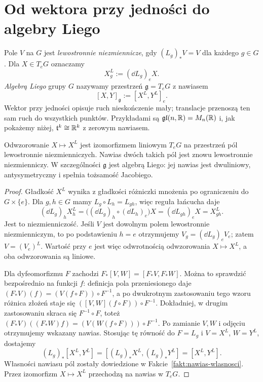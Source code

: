 \section{Od wektora przy jedności do algebry Liego}
\label{sec:algebra-liego}

\begin{definicja}
\label{def:algebra-liego}
Pole $V$ na $G$ jest \emph{lewostronnie niezmiennicze}, gdy
$(L_g)_*V=V$ dla każdego $g\in G$. Dla $X\in T_eG$ oznaczamy
\[
 X^L_g:=(\dd L_g)_eX.
\]
\emph{Algebrą Liego} grupy $G$ nazywamy przestrzeń
$\mathfrak g=T_eG$ z nawiasem
\[
 [X,Y]_{\mathfrak g}:=[X^L,Y^L]_e.
\]
Wektor przy jedności opisuje ruch nieskończenie mały; translacje
przenoszą ten sam ruch do wszystkich punktów. Przykładami są
$\mathfrak{gl}(n,\mathbb{R})=M_n(\mathbb{R})$ i, jak pokażemy niżej,
$\mathfrak t^k\cong\mathbb{R}^k$ z zerowym nawiasem.
\end{definicja}

\begin{twierdzenie}
\label{thm:lie-algebra-fields}
Odwzorowanie $X\mapsto X^L$ jest izomorfizmem liniowym
$T_eG$ na przestrzeń pól lewostronnie niezmienniczych.
Nawias dwóch takich pól jest znowu lewostronnie niezmienniczy.
W szczególności $\mathfrak g$ jest algebrą Liego: jej nawias jest
dwuliniowy, antysymetryczny i spełnia tożsamość Jacobiego.
\end{twierdzenie}
\begin{proof}
Gładkość $X^L$ wynika z gładkości różniczki mnożenia po
ograniczeniu do $G\times\{e\}$. Dla $g,h\in G$ mamy
$L_g\circ L_h=L_{gh}$, więc reguła łańcucha daje
\[
 (\dd L_g)_h X^L_h
 = \bigl((\dd L_g)_h\circ(\dd L_h)_e\bigr)X
 = (\dd L_{gh})_eX=X^L_{gh}.
\]
Jest to niezmienniczość. Jeśli $V$ jest dowolnym polem
lewostronnie niezmienniczym, to po podstawieniu $h=e$
otrzymujemy $V_g=(\dd L_g)_eV_e$; zatem $V=(V_e)^L$.
Wartość przy $e$ jest więc odwrotnością odwzorowania
$X\mapsto X^L$, a oba odwzorowania są liniowe.

Dla dyfeomorfizmu $F$ zachodzi
$F_*[V,W]=[F_*V,F_*W]$. Można to sprawdzić bezpośrednio
na funkcji $f$: definicja pola przeniesionego daje
$(F_*V)(f)=(V(f\circ F))\circ F^{-1}$, a po dwukrotnym
zastosowaniu tego wzoru różnica złożeń staje się
$([V,W](f\circ F))\circ F^{-1}$.
Dokładniej, w drugim zastosowaniu skraca się
$F^{-1}\circ F$, toteż
$(F_*V)((F_*W)f)=(V(W(f\circ F)))\circ F^{-1}$.
Po zamianie $V,W$ i odjęciu otrzymujemy wskazany nawias.
Stosując tę równość do $F=L_g$ i $V=X^L$, $W=Y^L$,
dostajemy
\[
 (L_g)_*[X^L,Y^L]
 =[(L_g)_*X^L,(L_g)_*Y^L]=[X^L,Y^L].
\]
Własności nawiasu pól zostały dowiedzione w
Fakcie~\ref{fakt:nawias-wlasnosci}. Przez izomorfizm
$X\mapsto X^L$ przechodzą na nawias w $T_eG$.
\end{proof}

